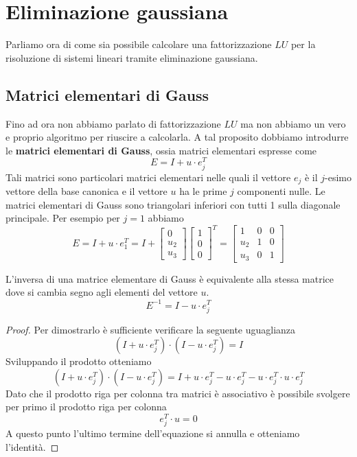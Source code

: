 \section{Eliminazione gaussiana}
Parliamo ora di come sia possibile calcolare una fattorizzazione $LU$ per la risoluzione di sistemi lineari
tramite eliminazione gaussiana.

\subsection{Matrici elementari di Gauss}
Fino ad ora non abbiamo parlato di fattorizzazione $LU$ ma non abbiamo un vero e proprio algoritmo per riuscire a
calcolarla. A tal proposito dobbiamo introdurre le \textbf{matrici elementari di Gauss}, ossia matrici elementari
espresse come
\[ E = I + u \cdot e_j^T \]
Tali matrici sono particolari matrici elementari nelle quali il vettore $e_j$ è il $j$-esimo vettore della base
canonica e il vettore $u$ ha le prime $j$ componenti nulle. Le matrici elementari di Gauss sono triangolari
inferiori con tutti 1 sulla diagonale principale. Per esempio per $j=1$ abbiamo
\[
	E = I + u \cdot e_1^T = I +
	\begin{bmatrix}
		0 \\ u_2 \\ u_3
	\end{bmatrix} \begin{bmatrix}
		1 \\ 0 \\ 0
	\end{bmatrix}^T = \begin{bmatrix}
		1   & 0 & 0 \\
		u_2 & 1 & 0 \\
		u_3 & 0 & 1
	\end{bmatrix}
\]
\begin{theorem}
	L'inversa di una matrice elementare di Gauss è equivalente alla stessa matrice dove si cambia segno agli
	elementi del vettore $u$.
	\[ E^{-1} = I - u \cdot e_j^T \]
	\begin{proof}
		Per dimostrarlo è sufficiente verificare la seguente uguaglianza
		\[ (I + u \cdot e_j^T) \cdot (I - u \cdot e_j^T) = I \]
		Sviluppando il prodotto otteniamo
		\[
			(I + u \cdot e_j^T) \cdot (I - u \cdot e_j^T) =
			I + u \cdot e_j^T - u \cdot e_j^T - u \cdot e_j^T \cdot u \cdot e_j^T
		\]
		Dato che il prodotto riga per colonna tra matrici è associativo è possibile svolgere per primo il prodotto
		riga per colonna
		\[ e_j^T \cdot u = 0 \]
		A questo punto l'ultimo termine dell'equazione si annulla e otteniamo l'identità.
	\end{proof}
\end{theorem}

